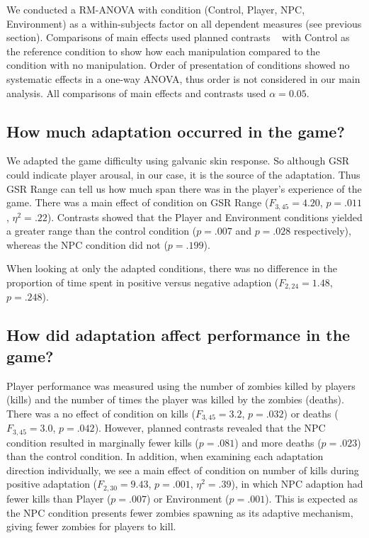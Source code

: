 We conducted a RM-ANOVA with condition (Control, Player, NPC, Environment) as a within-subjects factor on all dependent measures (see previous section). Comparisons of main effects used planned contrasts ~\cite{field2013discovering} with Control as the reference condition to show how each manipulation compared to the condition with no manipulation. Order of presentation of conditions showed no systematic effects in a one-way ANOVA, thus order is not considered in our main analysis. All comparisons of main effects and contrasts used $\alpha = 0.05$.

\subsection{How much adaptation occurred in the game?}

We adapted the game difficulty using galvanic skin response. So although GSR could indicate player arousal, in our case, it is the source of the adaptation. Thus GSR Range can tell us how much span there was in the player’s experience of the game. There was a main effect of condition on GSR Range ($F_{3,45} = 4.20$, $p = .011$, $\eta^{2} = .22$). Contrasts showed that the Player and Environment conditions yielded a greater range than the control condition ($p = .007$ and $p = .028$ respectively), whereas the NPC condition did not ($p = .199$).

When looking at only the adapted conditions, there was no difference in the proportion of time spent in positive versus negative adaption ($F_{2,24} = 1.48$, $p = .248$).


\subsection{How did adaptation affect performance in the game?}

Player performance was measured using the number of zombies killed by players (kills) and the number of times the player was killed by the zombies (deaths). There was a no effect of condition on kills ($F_{3,45} = 3.2$, $p = .032$) or deaths ($F_{3,45} = 3.0$, $p = .042$). However, planned contrasts revealed that the NPC condition resulted in marginally fewer kills ($p = .081$) and more deaths ($p = .023$) than the control condition. In addition, when examining each adaptation direction individually, we see a main effect of condition on number of kills during positive adaptation ($F_{2,30} = 9.43$, $p = .001$, $\eta^{2} = .39$), in which NPC adaption had fewer kills than Player ($p = .007$) or Environment ($p = .001$). This is expected as the NPC condition presents fewer zombies spawning as its adaptive mechanism, giving fewer zombies for players to kill.

